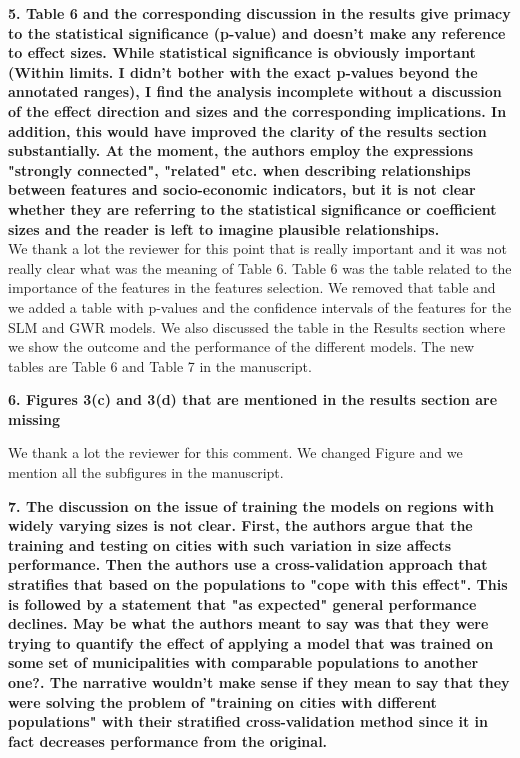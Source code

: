 \documentclass[12pt]{article}
\begin{document}
\textbf{5. Table 6 and the corresponding discussion in the results give primacy to the statistical significance (p-value) and doesn't make any reference to effect sizes. While statistical significance is obviously important (Within limits. I didn't bother with the exact p-values beyond the annotated ranges),  I find the analysis incomplete without a discussion of the effect direction and sizes and the corresponding implications. In addition, this would have improved the clarity of the results section substantially. At the moment, the authors employ the expressions "strongly connected", "related" etc. when describing relationships between features and socio-economic indicators, but it is not clear whether they are referring to the statistical significance or coefficient sizes and the reader is left to imagine plausible relationships.}
\\
We thank a lot the reviewer for this point that is really important and it was not really clear what was the meaning of Table 6. Table 6 was the table related to the importance of the features in the features selection. We removed that table and we added a table with p-values and   the confidence intervals of the features for the SLM and GWR models. We also discussed the table in the Results section where we show the outcome and the performance of the different models. The new tables are Table 6 and Table 7 in the manuscript. 


\textbf{6. Figures 3(c) and 3(d) that are mentioned in the results section are missing}

We thank a lot the reviewer for this comment. We changed Figure and we mention all the subfigures in the manuscript.

\textbf{7. The discussion on the issue of training the models on regions with widely varying sizes is not clear. First, the authors argue that the training and testing on cities with such variation in size affects performance. Then the authors use a cross-validation approach that stratifies that based on the populations to "cope with this effect". This is followed by a statement that "as expected" general performance declines. May be what the authors meant to say was that they were trying to quantify the effect of applying a model that was trained on some set of municipalities with comparable populations to another one?. The narrative wouldn't make sense if they mean to say that they were solving the problem of "training on cities with different populations" with their stratified cross-validation method since it in fact decreases performance from the original.}
\end{document}
